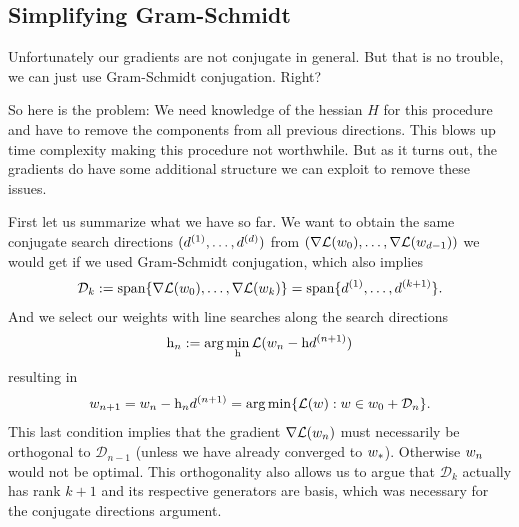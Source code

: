\subsection{Simplifying Gram-Schmidt}

Unfortunately our gradients are not conjugate in general. But that is no
trouble, we can just use Gram-Schmidt conjugation. Right?

So here is the problem: We need knowledge of the hessian \(H\) for this
procedure and have to remove the components from all previous directions. This
blows up time complexity making this procedure not worthwhile. But as it turns
out, the gradients do have some additional structure we can exploit to remove
these issues.

First let us summarize what we have so far. We want to obtain the same conjugate
search directions \((d^{(1)},\dots,d^{(d)})\) from
\((\nabla\mathcal{L}(w_0),\dots,\nabla\mathcal{L}(w_{d-1}))\)
we would get if we used Gram-Schmidt conjugation, which also implies
\begin{align*}
	\mathcal{D}_k := \text{span}\{\nabla\mathcal{L}(w_0),\dots,\nabla\mathcal{L}(w_k)\}
	= \text{span}\{d^{(1)},\dots,d^{(k+1)}\}.
\end{align*}
And we select our weights with line searches along the search directions
\begin{align*}
	\text{h}_n := \arg\min_{\text{h}} \mathcal{L}(w_n - \text{h} d^{(n+1)})
\end{align*}
resulting in
\begin{align*}
	w_{n+1} = w_n - \text{h}_n d^{(n+1)}
	= \arg\min\{ \mathcal{L}(w) : w\in w_0 + \mathcal{D}_n\}.
\end{align*}
This last condition implies that the gradient \(\nabla\mathcal{L}(w_n)\)
must necessarily be orthogonal to \(\mathcal{D}_{n-1}\) (unless we have already
converged to \(w_*\)). Otherwise \(w_n\) would not be optimal. This
orthogonality also allows us to argue that \(\mathcal{D}_k\) actually has rank
\(k+1\) and its respective generators are basis, which was necessary for the
conjugate directions argument.

